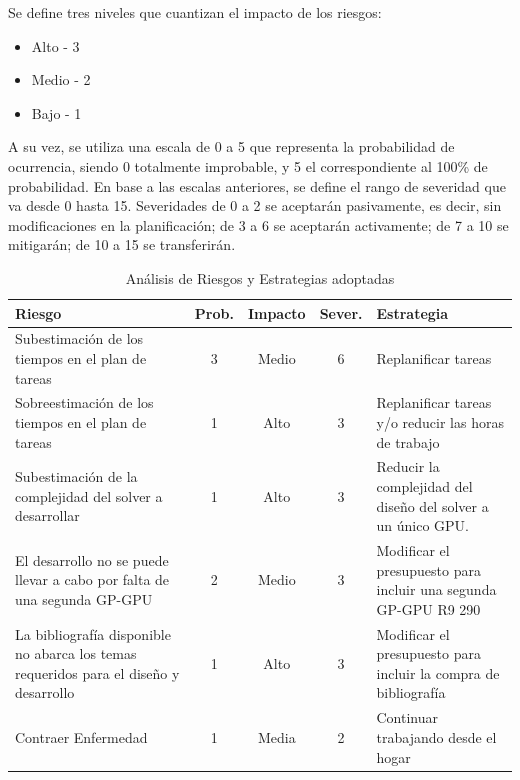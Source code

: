 Se define tres niveles que cuantizan el impacto de los riesgos:
\begin{itemize}
\small
\item Alto - 3
\item Medio - 2
\item Bajo - 1
\end{itemize}
A su vez, se utiliza una escala de 0 a 5 que representa la probabilidad de ocurrencia, siendo 0 totalmente improbable, y 5 el correspondiente al 100\% de probabilidad.
En base a las escalas anteriores, se define el rango de severidad que va desde 0 hasta 15.
Severidades de 0 a 2 se aceptarán pasivamente, es decir, sin modificaciones en la planificación; de 3 a 6 se aceptarán activamente; de 7 a 10 se mitigarán; de 10 a 15 se transferirán.

\begin{table}[h] %
\small
\label{tabla:riesgos}
\caption{Análisis de Riesgos y Estrategias adoptadas}
\begin{tabular}{p{4cm}|c|c|c|p{4cm}|}
\hline
\textbf{Riesgo} & \textbf{Prob.} & \textbf{Impacto} & \textbf{Sever.} & \textbf{Estrategia} \\ \hline

Subestimación de los tiempos en el plan de tareas & 3 & Medio & 6 & Replanificar tareas \\

Sobreestimación de los tiempos en el plan de tareas & 1 & Alto & 3 & Replanificar tareas y/o reducir las horas de trabajo \\

Subestimación de la complejidad del solver a desarrollar & 1 & Alto & 3 & Reducir la complejidad del diseño del solver a un único GPU. \\

El desarrollo no se puede llevar a cabo por falta de una segunda GP-GPU & 2 & Medio & 3 & Modificar el presupuesto para incluir una segunda GP-GPU R9 290 \\

La bibliografía disponible no abarca los temas requeridos para el diseño y desarrollo & 1 & Alto & 3 & Modificar el presupuesto para incluir la compra de bibliografía\\

Contraer Enfermedad & 1 & Media & 2 & Continuar trabajando desde el hogar\\

\hline

\end{tabular}
\end{table}

%
%

